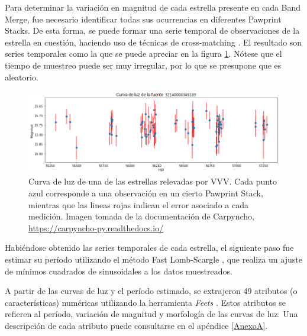 \par Para determinar la variación en magnitud de cada estrella presente en cada Band Merge, fue necesario identificar todas sus ocurrencias en diferentes Pawprint Stacks. De esta forma, se puede formar una serie temporal de observaciones de la estrella en cuestión, haciendo uso de técnicas de cross-matching \cite{cross}. El resultado son series temporales como la que se puede apreciar en la figura \ref{fig:curva_de_luz}. Nótese que el tiempo de muestreo puede ser muy irregular, por lo que se presupone que es aleatorio. \\


\begin{figure}[h]
\begin{center}
\includegraphics[width=\textwidth]{Kap1/light_curve.png}
\end{center}
\caption[short]{Curva de luz de una de las estrellas relevadas por VVV. Cada punto azul corresponde a una observación en un cierto Pawprint Stack, mientras que las lineas rojas indican el error asociado a cada medición. Imagen tomada de la documentación de Carpyncho, \url{https://carpyncho-py.readthedocs.io/} }
\label{fig:curva_de_luz}
\end{figure}

\par Habiéndose obtenido las series temporales de cada estrella, el siguiente paso fue estimar su período utilizando el método Fast Lomb-Scargle \cite{Lomb:1976wy} \cite{scargle} \cite{VanderPlas_2018}, que realiza un ajuste de mínimos cuadrados de sinusoidales a los datos muestreados.\\

\par A partir de las curvas de luz y el período estimado, se extrajeron 49 atributos (o características) numéricas utilizando la herramienta \textit{Feets} \cite{cabral2018fats}. Estos atributos se refieren al período, variación de magnitud y morfología de las curvas de luz. Una descripción de cada atributo puede consultarse en el apéndice \ref{AnexoA}. \\

